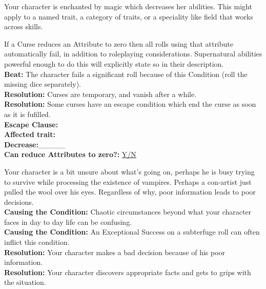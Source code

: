 \documentclass[10pt, frontgrid, backgrid]{flacards}
\begin{document}
{
Your character is enchanted by magic which decreases her abilities. This might apply to a named trait, a category of traits, or a speciality like field that works across skills.

If a Curse reduces an Attribute to zero then all rolls using that attribute automatically fail, in addition to roleplaying considerations. Supernatural abilities powerful enough to do this will explicitly state so in their description.\\
\textbf{Beat:} The character fails a significant roll because of this Condition (roll the missing dice separately).\\
\textbf{Resolution:} Curses are temporary, and vanish after a while.\\
\textbf{Resolution:} Some curses have an escape condition which end the curse as soon as it is fufilled.\\
\textbf{Escape Clause:}\fillunderline\\
\textbf{Affected trait:}\fillunderline\\
\textbf{Decrease:}\_\_\_\_\_ \\
\textbf{Can reduce Attributes to zero?:} \underline{Y/N}
}
{Your character is a bit unsure about what's going on, perhaps he is busy trying to survive while processing the existence of vampires. Perhaps a con-artist just pulled the wool over his eyes. Regardless of why, poor information leads to poor decisions.\\
\textbf{Causing the Condition:} Chaotic circumstances beyond what your character faces in day to day life can be confusing. \\
\textbf{Causing the Condition:} An Exceptional Success on a subterfuge roll can often inflict this condition. \\
\textbf{Resolution:} Your character makes a bad decision because of his poor information. \\
\textbf{Resolution:} Your character discovers appropriate facts and gets to grips with the situation. 
}
\end{document}

